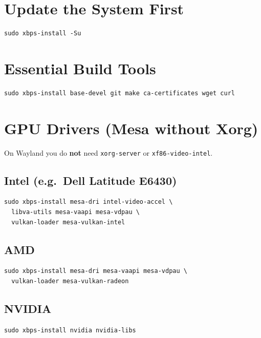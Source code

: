 \documentclass[12pt, a4paper]{book}
\begin{document}
\section{Update the System First}

\begin{lstlisting}
sudo xbps-install -Su
\end{lstlisting}

\section{Essential Build Tools}

\begin{lstlisting}
sudo xbps-install base-devel git make ca-certificates wget curl
\end{lstlisting}

\section{GPU Drivers (Mesa without Xorg)}

\begin{notebox}
On Wayland you do \textbf{not} need \texttt{xorg-server} or \texttt{xf86-video-intel}.
\end{notebox}

\subsection{Intel (e.g.\ Dell Latitude E6430)}
\begin{lstlisting}
sudo xbps-install mesa-dri intel-video-accel \
  libva-utils mesa-vaapi mesa-vdpau \
  vulkan-loader mesa-vulkan-intel
\end{lstlisting}

\subsection{AMD}
\begin{lstlisting}
sudo xbps-install mesa-dri mesa-vaapi mesa-vdpau \
  vulkan-loader mesa-vulkan-radeon
\end{lstlisting}

\subsection{NVIDIA}
\begin{lstlisting}
sudo xbps-install nvidia nvidia-libs
\end{lstlisting}
\end{document}
